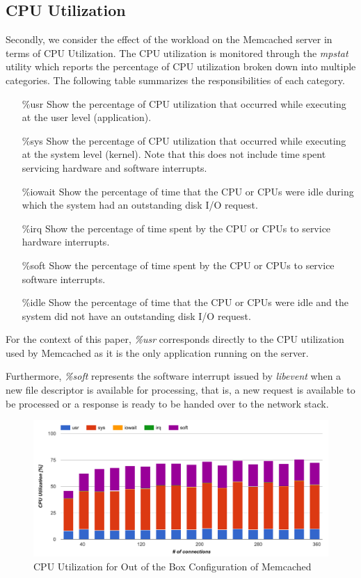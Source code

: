 \subsection{CPU Utilization}

Secondly, we consider the effect of the workload on the Memcached server in terms of CPU Utilization. The CPU utilization is monitored through the \textit{mpstat} \cite{mpstat} utility which reports the percentage of CPU utilization broken down into multiple categories. The following table \cite{mpstat} summarizes the responsibilities of each category.

\begin{enumerate}
    \item [\%usr] Show the percentage of CPU utilization that occurred while executing at the user level (application).
    \item [\%sys] Show the percentage of CPU utilization that occurred while executing at the system level (kernel). Note that this does not include time spent servicing hardware and software interrupts.
    \item [\%iowait] Show the percentage of time that the CPU or CPUs were idle during which the system had an outstanding disk I/O request.
    \item [\%irq] Show the percentage of time spent by the CPU or CPUs to service hardware interrupts.
    \item [\%soft] Show the percentage of time spent by the CPU or CPUs to service software interrupts.
    \item [\%idle] Show the percentage of time that the CPU or CPUs were idle and the system did not have an outstanding disk I/O request.
\end{enumerate}

For the context of this paper, \textit{\%usr} corresponds directly to the CPU utilization used by Memcached as it is the only application running on the server.

Furthermore, \textit{\%soft} represents the software interrupt issued by \textit{libevent} when a new file descriptor is available for processing, that is, a new request is available to be processed or a response is ready to be handed over to the network stack.

\begin{figure}[h]
    \includegraphics[width=\textwidth]{./res2/m_baseline_cpu.png}
    \caption{CPU Utilization for Out of the Box Configuration of Memcached}
    \label{fig:m_baseline_cpu}
\end{figure}

